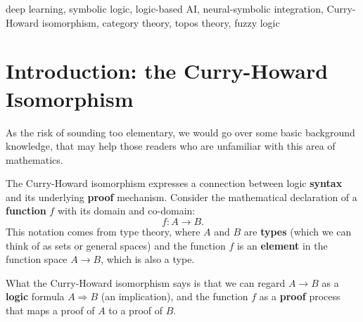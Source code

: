 \documentclass[orivec]{llncs}
\begin{document}
\begin{keywords}
deep learning, symbolic logic, logic-based AI, neural-symbolic integration, Curry-Howard isomorphism, category theory, topos theory, fuzzy logic
\end{keywords}




\setcounter{section}{-1}
\section{Introduction: the Curry-Howard Isomorphism}
\label{sec:0}

As the risk of sounding too elementary, we would go over some basic background knowledge, that may help those readers who are unfamiliar with this area of mathematics.

The Curry-Howard isomorphism expresses a connection between logic \textbf{syntax} and its underlying \textbf{proof} mechanism.  Consider the mathematical declaration of a \textbf{function} $f$ with its domain and co-domain:
\begin{equation}
f: A \rightarrow B .
\end{equation}
This notation comes from type theory, where $A$ and $B$ are \textbf{types} (which we can think of as sets or general spaces) and the function $f$ is an \textbf{element} in the function space $A \rightarrow B$, which is also a type.

What the Curry-Howard isomorphism says is that we can regard $A \rightarrow B$ as a \textbf{logic} formula $A \Rightarrow B$ (an implication), and the function $f$ as a \textbf{proof} process that maps a proof of $A$ to a proof of $B$.
\end{document}
